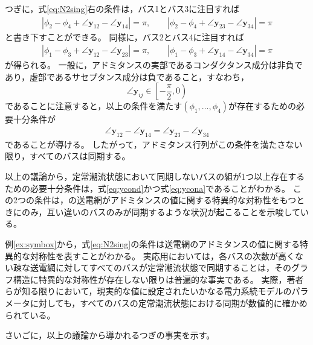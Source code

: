 \documentclass[tombow,dvipdfmx]{corona-a5-1.1}
\begin{document}
\begin{例}
つぎに，式\ref{eq:N2sing}右の条件は，バス1とバス3に注目すれば
\begin{align*}
|\phi_2 - \phi_4 + \angle \bm{y}_{12} - \angle \bm{y}_{14}|=\pi
,\qquad
|\phi_2 - \phi_4 + \angle \bm{y}_{23} - \angle \bm{y}_{34}|=\pi
\end{align*}
と書き下すことができる。
同様に，バス2とバス4に注目すれば
\begin{align*}
|\phi_1 - \phi_3 + \angle \bm{y}_{12} - \angle \bm{y}_{23}|=\pi
,\qquad
|\phi_1 - \phi_3 + \angle \bm{y}_{14} - \angle \bm{y}_{34}|=\pi
\end{align*}
が得られる。
一般に，アドミタンスの実部であるコンダクタンス成分は非負であり，虚部であるサセプタンス成分は負であること，すなわち，
\[
\angle \bm{y}_{ij} \in \left[-\frac{\pi}{2},0 \right)
\]
であることに注意すると，以上の条件を満たす$(\phi_1,\ldots,\phi_4)$が存在するための必要十分条件が
\begin{align}\label{eq:ycona}
\angle \bm{y}_{12} - \angle \bm{y}_{14}=
\angle \bm{y}_{23} - \angle \bm{y}_{34}
\end{align}
であることが導ける。
したがって，アドミタンス行列がこの条件を満たさない限り，すべてのバスは同期する。

以上の議論から，定常潮流状態において同期しないバスの組が1つ以上存在するための必要十分条件は，式\ref{eq:ycond}かつ式\ref{eq:ycona}であることがわかる。
この2つの条件は，の送電網がアドミタンスの値に関する特異的な対称性をもつときにのみ，互い違いのバスのみが同期するような状況が起こることを示唆している。
\end{例}

例\ref{ex:symbox}から，式\ref{eq:N2sing}の条件は送電網のアドミタンスの値に関する特異的な対称性を表すことがわかる。
実応用においては，各バスの次数が高くない疎な送電網に対してすべてのバスが定常潮流状態で同期することは，そのグラフ構造に特異的な対称性が存在しない限りは普遍的な事実である。
実際，著者らが知る限りにおいて，現実的な値に設定されたいかなる電力系統モデルのパラメータに対しても，すべてのバスの定常潮流状態における同期が数値的に確かめられている。


さいごに，以上の議論から導かれるつぎの事実を示す。
\end{document}
